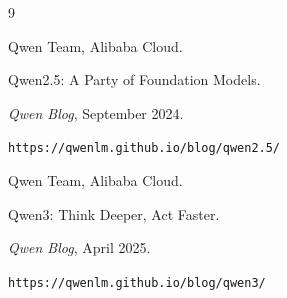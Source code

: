 \begin{thebibliography}{9}










Qwen Team, Alibaba Cloud.





\newblock Qwen2.5: A Party of Foundation Models.





\newblock \emph{Qwen Blog}, September 2024.





\newblock \texttt{https://qwenlm.github.io/blog/qwen2.5/}
















Qwen Team, Alibaba Cloud.





\newblock Qwen3: Think Deeper, Act Faster.





\newblock \emph{Qwen Blog}, April 2025.





\newblock \texttt{https://qwenlm.github.io/blog/qwen3/}





\end{thebibliography}





















